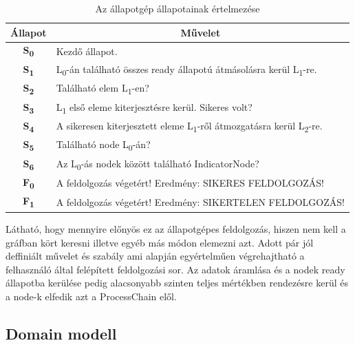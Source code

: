 \documentclass[a4paper,12pt,oneside]{report}
\begin{document}
\begin{table}[h]
\begin{tabular}{p{1cm}|p{12cm}}

\toprule
\multicolumn{1}{c|}{\textbf{Állapot}} & \multicolumn{1}{|c}{\textbf{Művelet}} \\ \midrule
\multicolumn{1}{c|}{\textbf{S\textsubscript{0}}}  & Kezdő állapot. \\
\hline
\multicolumn{1}{c|}{\textbf{S\textsubscript{1}}}  &  L\textsubscript{0}-án található összes ready állapotú átmásolásra kerül L\textsubscript{1}-re.\\
\hline
\multicolumn{1}{c|}{\textbf{S\textsubscript{2}}}  & Található elem L\textsubscript{1}-en? \\
\hline
\multicolumn{1}{c|}{\textbf{S\textsubscript{3}}}  & L\textsubscript{1} első eleme kiterjesztésre kerül. Sikeres volt?  \\
\hline
\multicolumn{1}{c|}{\textbf{S\textsubscript{4}}}  & A sikeresen kiterjesztett eleme L\textsubscript{1}-ről átmozgatásra kerül L\textsubscript{2}-re.  \\
\hline
\multicolumn{1}{c|}{\textbf{S\textsubscript{5}}}  & Található node L\textsubscript{0}-án? \\
\hline
\multicolumn{1}{c|}{\textbf{S\textsubscript{6}}} & Az L\textsubscript{0}-ás nodek között található IndicatorNode? \\
\hline
\multicolumn{1}{c|}{\textbf{F\textsubscript{0}}} &  A feldolgozás végetért! Eredmény: SIKERES FELDOLGOZÁS!\\
\hline
\multicolumn{1}{c|}{\textbf{F\textsubscript{1}}} & A feldolgozás végetért! Eredmény: SIKERTELEN FELDOLGOZÁS! \\
\hline
\end{tabular}
\caption{Az állapotgép állapotainak értelmezése }
\label{table:nonfunct_req_table}
\end{table}

Látható, hogy mennyire előnyös ez az állapotgépes feldolgozás, hiszen nem kell a gráfban kört keresni illetve egyéb más módon elemezni azt. Adott pár jól deffiniált művelet és szabály ami alapján egyértelműen végrehajtható a felhasználó által felépített feldolgozási sor. Az adatok áramlása és a nodek ready állapotba kerülése pedig alacsonyabb szinten teljes mértékben rendezésre kerül és a node-k elfedik azt a ProcessChain elől.
\subsection{Domain modell}
\end{document}
